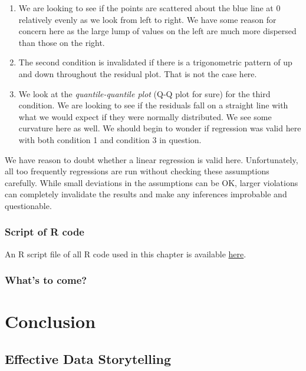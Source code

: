 \documentclass[]{tufte-book}
\begin{document}
\begin{enumerate}
\def\labelenumi{\arabic{enumi}.}
\item
  We are looking to see if the points are scattered about the blue line
  at 0 relatively evenly as we look from left to right. We have some
  reason for concern here as the large lump of values on the left are
  much more dispersed than those on the right.
\item
  The second condition is invalidated if there is a trigonometric
  pattern of up and down throughout the residual plot. That is not the
  case here.
\item
  We look at the \emph{quantile-quantile plot} (Q-Q plot for sure) for
  the third condition. We are looking to see if the residuals fall on a
  straight line with what we would expect if they were normally
  distributed. We see some curvature here as well. We should begin to
  wonder if regression was valid here with both condition 1 and
  condition 3 in question.
\end{enumerate}

We have reason to doubt whether a linear regression is valid here.
Unfortunately, all too frequently regressions are run without checking
these assumptions carefully. While small deviations in the assumptions
can be OK, larger violations can completely invalidate the results and
make any inferences improbable and questionable.

\section{Script of R code}\label{script-of-r-code-4}

An R script file of all R code used in this chapter is available
\href{http://ismayc.github.io/moderndiver-book/09-regress.R}{here}.

\section{What's to come?}\label{whats-to-come-6}

\part{Conclusion}\label{part-conclusion}

\chapter{Effective Data Storytelling}\label{effective-data-storytelling}
\end{document}
